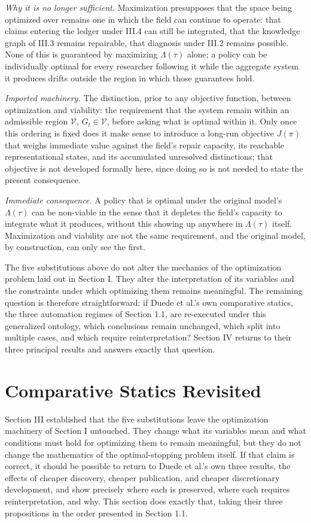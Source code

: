 \documentclass[11pt]{article}
\begin{document}
\textit{Why it is no longer sufficient.} Maximization presupposes that the space being optimized over remains one in which the field can continue to operate: that claims entering the ledger under III.4 can still be integrated, that the knowledge graph of III.3 remains repairable, that diagnosis under III.2 remains possible. None of this is guaranteed by maximizing $\Lambda(\tau)$ alone; a policy can be individually optimal for every researcher following it while the aggregate system it produces drifts outside the region in which those guarantees hold.

\textit{Imported machinery.} The distinction, prior to any objective function, between optimization and viability: the requirement that the system remain within an admissible region $\mathcal{V}$, $G_t \in \mathcal{V}$, before asking what is optimal within it. Only once this ordering is fixed does it make sense to introduce a long-run objective $J(\pi)$ that weighs immediate value against the field's repair capacity, its reachable representational states, and its accumulated unresolved distinctions; that objective is not developed formally here, since doing so is not needed to state the present consequence.

\textit{Immediate consequence.} A policy that is optimal under the original model's $\Lambda(\tau)$ can be non-viable in the sense that it depletes the field's capacity to integrate what it produces, without this showing up anywhere in $\Lambda(\tau)$ itself. Maximization and viability are not the same requirement, and the original model, by construction, can only see the first.

\bigskip
\noindent The five substitutions above do not alter the mechanics of the optimization problem laid out in Section I. They alter the interpretation of its variables and the constraints under which optimizing them remains meaningful. The remaining question is therefore straightforward: if Duede et al.'s own comparative statics, the three automation regimes of Section 1.1, are re-executed under this generalized ontology, which conclusions remain unchanged, which split into multiple cases, and which require reinterpretation? Section IV returns to their three principal results and answers exactly that question.

\section{Comparative Statics Revisited}

Section III established that the five substitutions leave the optimization machinery of Section I untouched. They change what its variables mean and what conditions must hold for optimizing them to remain meaningful, but they do not change the mathematics of the optimal-stopping problem itself. If that claim is correct, it should be possible to return to Duede et al.'s own three results, the effects of cheaper discovery, cheaper publication, and cheaper discretionary development, and show precisely where each is preserved, where each requires reinterpretation, and why. This section does exactly that, taking their three propositions in the order presented in Section 1.1.
\end{document}
